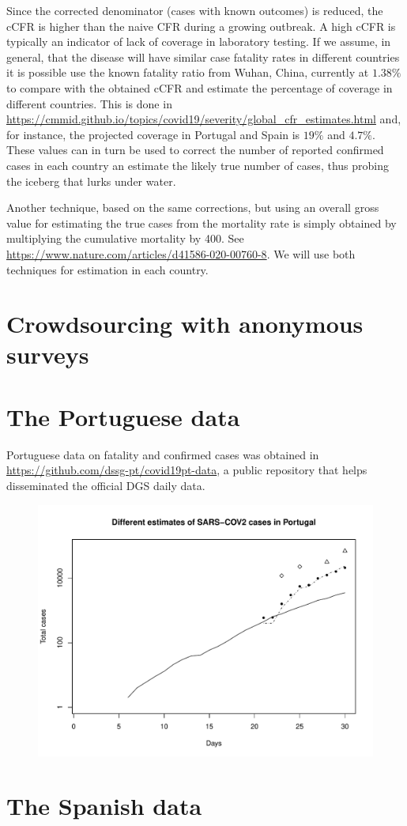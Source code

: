 \documentclass{article}
\begin{document}
Since the corrected denominator (cases with known outcomes) is reduced, the cCFR is higher than the naive CFR during a growing outbreak. A high cCFR is typically an indicator of lack of coverage in laboratory testing. If we assume, in general, that the disease will have similar case fatality rates in different countries it is possible use the known fatality ratio from Wuhan, China, currently at $1.38\%$
to compare with the obtained cCFR and estimate the percentage of coverage in different countries. This is done in \url{https://cmmid.github.io/topics/covid19/severity/global_cfr_estimates.html} and, for instance, the projected coverage in Portugal and Spain is $19\%$ and $4.7\%$. These values can in turn be used to correct the number of reported confirmed cases in each country an estimate the likely true number of cases, thus probing the iceberg that lurks under water.

Another technique, based on the same corrections, but using an overall gross value for estimating the true cases from the mortality rate is simply obtained by multiplying the cumulative mortality by 400. See \url{https://www.nature.com/articles/d41586-020-00760-8}. We will use both techniques for estimation in each country.

\section{Crowdsourcing with anonymous surveys}

\section{The Portuguese data}

Portuguese data on fatality and confirmed cases was obtained in \url{https://github.com/dssg-pt/covid19pt-data}, a public repository that helps disseminated the official DGS daily data.

\begin{figure}
\begin{center}
\includegraphics[width=.8\linewidth]{EstPTMar26.pdf}
\end{center}
\end{figure}

\section{The Spanish data}
\end{document}
